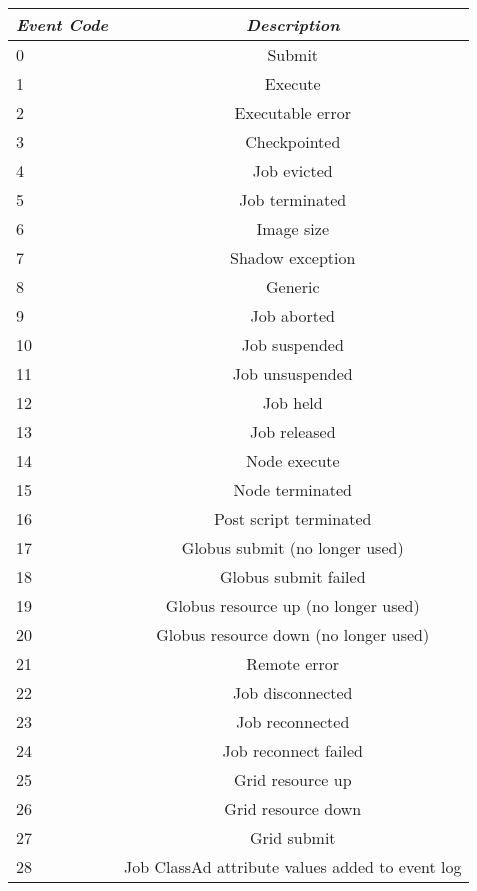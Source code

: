 \begin{center}
\begin{table}[hbt]
\begin{tabular}{|l|c|} \hline
\emph{Event Code} & \emph{Description}   \\ \hline \hline
0   &   Submit  \\ \hline
1   &   Execute  \\ \hline
2   &   Executable error  \\ \hline
3   &   Checkpointed  \\ \hline
4   &   Job evicted  \\ \hline
5   &   Job terminated  \\ \hline
6   &   Image size  \\ \hline
7   &   Shadow exception  \\ \hline
8   &   Generic  \\ \hline
9   &   Job aborted  \\ \hline
10  &   Job suspended  \\ \hline
11  &   Job unsuspended  \\ \hline
12  &   Job held  \\ \hline
13  &   Job released  \\ \hline
14  &   Node execute  \\ \hline
15  &   Node terminated  \\ \hline
16  &   Post script terminated  \\ \hline
17  &   Globus submit (no longer used)  \\ \hline
18  &   Globus submit failed  \\ \hline
19  &   Globus resource up (no longer used)  \\ \hline
20  &   Globus resource down (no longer used)  \\ \hline
21  &   Remote error  \\ \hline
22  &   Job disconnected  \\ \hline
23  &   Job reconnected  \\ \hline
24  &   Job reconnect failed  \\ \hline
25  &   Grid resource up \\ \hline
26  &   Grid resource down \\ \hline
27  &   Grid submit \\ \hline
28  &   Job ClassAd attribute values added to event log  \\ \hline
\end{tabular}
\label{user-log-event-codes}
\end{table}
\end{center}

